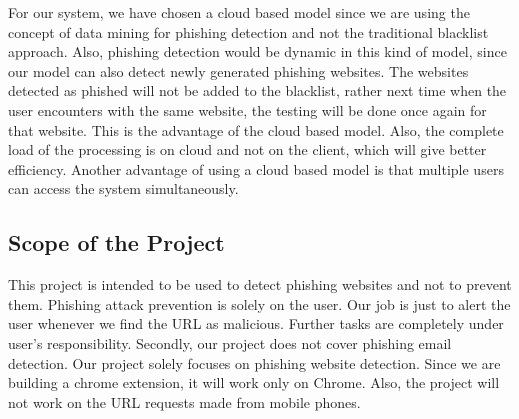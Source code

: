 \documentclass[12pt]{article}
\begin{document}
\noindent For our system, we have chosen a cloud based model since we are using the concept of data mining for phishing detection and not the traditional blacklist approach. Also, phishing detection would be dynamic in this kind of model, since our model can also detect newly generated phishing websites. The websites detected as phished will not be added to the blacklist, rather next time when the user encounters with the same website, the testing will be done once again for that website. This is the advantage of the cloud based model. Also, the complete load of the processing is on cloud and not on the client, which will give better efficiency. Another advantage of using a cloud based model is that multiple users can access the system simultaneously.

\subsection{Scope of the Project}
This project is intended to be used to detect phishing websites and not to prevent them. Phishing attack prevention is solely on the user. Our job is just to alert the user whenever we find the URL as malicious. Further tasks are completely under user’s responsibility. Secondly, our project does not cover phishing email detection. Our project solely focuses on phishing website detection. Since we are building a chrome extension, it will work only on Chrome. Also, the project will not work on the URL requests made from mobile phones.

\pagestyle{fancy}
\renewcommand{\headrulewidth}{0pt}

\appendix
\end{document}
